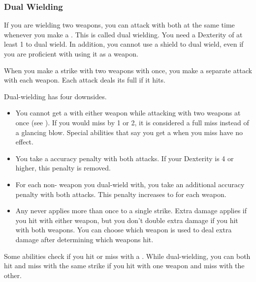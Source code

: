         \subsubsection{Dual Wielding}\label{Dual Wielding}
            If you are wielding two weapons, you can attack with both at the same time whenever you make a .
            This is called dual wielding.
            You need a Dexterity of at least 1 to dual wield.
            In addition, you cannot use a shield to dual wield, even if you are proficient with using it as a weapon.

            When you make a strike with two weapons with once, you make a separate attack with each weapon.
            Each attack deals its full  if it hits.

            Dual-wielding has four downsides.
            \begin{itemize}
                \item You cannot get a  with either weapon while attacking with two weapons at once (see ).
                    If you would miss by 1 or 2, it is considered a full miss instead of a glancing blow.
                    Special abilities that say you get a  when you miss have no effect.
                \item You take a  accuracy penalty with both attacks.
                    If your Dexterity is 4 or higher, this penalty is removed.
                \item For each non- weapon you dual-wield with, you take an additional  accuracy penalty with both attacks.
                    This penalty increases to  for each  weapon.
                \item Any  never applies more than once to a single strike.
                    Extra damage applies if you hit with either weapon, but you don't double extra damage if you hit with both weapons.
                    You can choose which weapon is used to deal extra damage after determining which weapons hit.
            \end{itemize}

            Some abilities check if you hit or miss with a .
            While dual-wielding, you can both hit and miss with the same strike if you hit with one weapon and miss with the other.

